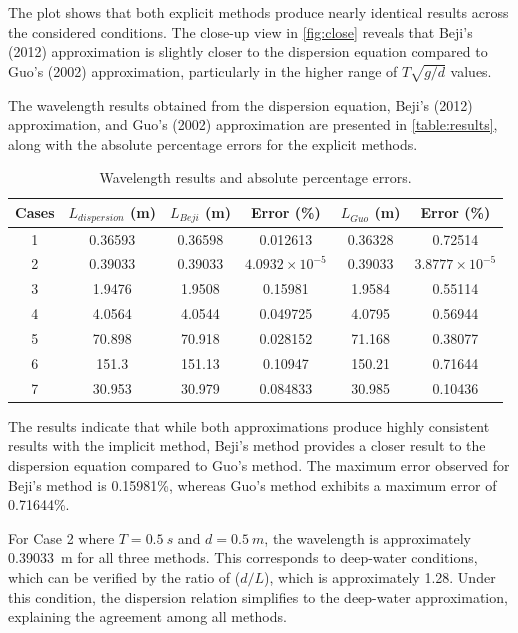 \documentclass[a4paper, 11pt]{article}
\begin{document}
The plot shows that both explicit methods produce nearly identical results across the considered conditions. The close-up view in \autoref{fig:close} reveals that Beji's (2012) approximation is slightly closer to the dispersion equation compared to Guo's (2002) approximation, particularly in the higher range of $T \sqrt{g/d}$ values. 

\vspace{0.5cm}

The wavelength results obtained from the dispersion equation, Beji's (2012) approximation, and Guo's (2002) approximation are presented in \autoref{table:results}, along with the absolute percentage errors for the explicit methods. 

\begin{table}[H]
    \centering
    \caption{Wavelength results and absolute percentage errors.}
    \begin{tabular}{|c|c|c|c|c|c|}
        \hline
        Cases & $L_{dispersion}$ (m) & $L_{Beji}$ (m) & Error (\%) & $L_{Guo}$ (m) & Error (\%) \\
        \hline
        1 & 0.36593 & 0.36598 & 0.012613 & 0.36328 & 0.72514 \\
        2 & 0.39033 & 0.39033 & $4.0932 \times 10^{-5}$ & 0.39033 & $3.8777 \times 10^{-5}$ \\
        3 & 1.9476 & 1.9508 & 0.15981 & 1.9584 & 0.55114 \\
        4 & 4.0564 & 4.0544 & 0.049725 & 4.0795 & 0.56944 \\
        5 & 70.898 & 70.918 & 0.028152 & 71.168 & 0.38077 \\
        6 & 151.3 & 151.13 & 0.10947 & 150.21 & 0.71644 \\
        7 & 30.953 & 30.979 & 0.084833 & 30.985 & 0.10436 \\
        \hline
    \end{tabular}
    \label{table:results}
\end{table}
    

The results indicate that while both approximations produce highly consistent results with the implicit method, Beji's method provides a closer result to the dispersion equation compared to Guo's method. The maximum error observed for Beji's method is 0.15981\%, whereas Guo's method exhibits a maximum error of 0.71644\%. 

\vspace{0.1cm}

For Case 2 where $T = 0.5~s$ and $d = 0.5~m$, the wavelength is approximately 0.39033~m for all three methods. This corresponds to deep-water conditions, which can be verified by the ratio of ($d/L$), which is approximately 1.28. Under this condition, the dispersion relation simplifies to the deep-water approximation, explaining the agreement among all methods.
\end{document}
